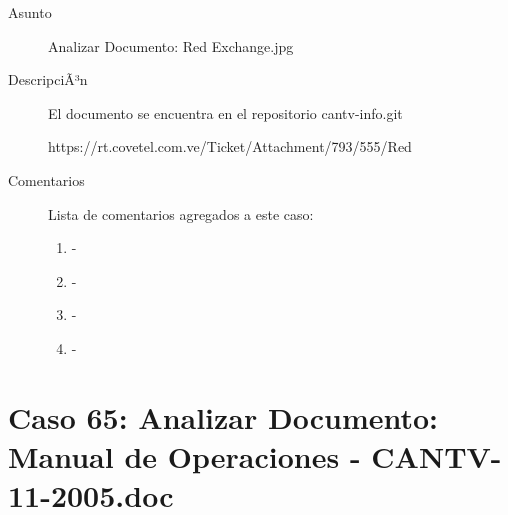 \begin{description}

\item[Asunto] Analizar Documento: Red Exchange.jpg\item[DescripciÃ³n] El documento se encuentra en el repositorio cantv-info.git

https://rt.covetel.com.ve/Ticket/Attachment/793/555/Red%

\item[Comentarios] Lista de comentarios agregados a este caso:  
\begin{enumerate}
        \item {\bfseries  } - {\bfseries } \\         \item {\bfseries  } - {\bfseries } \\         \item {\bfseries  } - {\bfseries } \\         \item {\bfseries  } - {\bfseries } \\     \end{enumerate}

\end{description}

\section{Caso 65: Analizar Documento: Manual de Operaciones - CANTV-11-2005.doc }

